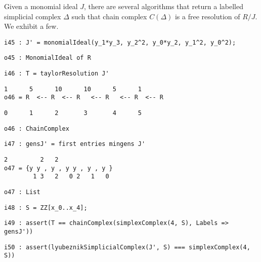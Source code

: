 \documentclass[12pt,leqno]{amsart}
\theoremstyle{definition}
\begin{document}
Given a monomial ideal $J$, there are several algorithms that return a
labelled simplicial complex $\Delta$ such that chain complex $C(\Delta)$ is a
free resolution of $R/J$.  We exhibit a few.
\begin{lstlisting}[xleftmargin=10pt, aboveskip=3.0pt, belowskip=1.5pt]
i45 : J' = monomialIdeal(y_1*y_3, y_2^2, y_0*y_2, y_1^2, y_0^2);
\end{lstlisting}
\begin{lstlisting}[xleftmargin=10pt, aboveskip=1.5pt, belowskip=1.5pt]
o45 : MonomialIdeal of R
\end{lstlisting}
\begin{lstlisting}[xleftmargin=10pt, aboveskip=1.5pt, belowskip=1.5pt]
i46 : T = taylorResolution J'
\end{lstlisting}
\vfill
\begin{lstlisting}[xleftmargin=10pt, lineskip=-10pt, aboveskip=1.5pt, belowskip=1.5pt]
       1      5      10      10      5      1
o46 = R  <-- R  <-- R   <-- R   <-- R  <-- R
\end{lstlisting}
\begin{lstlisting}[xleftmargin=10pt, aboveskip=1.5pt, belowskip=1.5pt] 
      0      1      2       3       4      5
\end{lstlisting}
\begin{lstlisting}[xleftmargin=10pt, aboveskip=1.5pt, belowskip=1.5pt]
o46 : ChainComplex
\end{lstlisting}
\begin{lstlisting}[xleftmargin=10pt, aboveskip=1.5pt, belowskip=1.5pt]
i47 : gensJ' = first entries mingens J'
\end{lstlisting}
\begin{lstlisting}[xleftmargin=10pt, lineskip=-10pt, aboveskip=1.5pt, belowskip=1.5pt]
              2         2   2
o47 = {y y , y , y y , y , y }
        1 3   2   0 2   1   0
\end{lstlisting}
\begin{lstlisting}[xleftmargin=10pt, aboveskip=1.5pt, belowskip=1.5pt]
o47 : List
\end{lstlisting}
\begin{lstlisting}[xleftmargin=10pt, aboveskip=1.5pt, belowskip=1.5pt]
i48 : S = ZZ[x_0..x_4];
\end{lstlisting}
\begin{lstlisting}[xleftmargin=10pt, aboveskip=1.5pt, belowskip=1.5pt]
i49 : assert(T == chainComplex(simplexComplex(4, S), Labels => gensJ'))
\end{lstlisting}
\begin{lstlisting}[xleftmargin=10pt, aboveskip=1.5pt, belowskip=1.5pt]
i50 : assert(lyubeznikSimplicialComplex(J', S) === simplexComplex(4, S))
\end{lstlisting}
\end{document}
